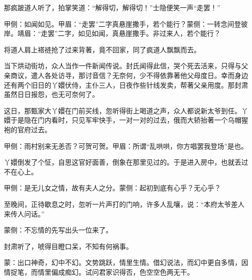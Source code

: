 \begin{parag}
    那疯跛道人听了，拍掌笑道：“解得切，解得切！”士隐便笑一声“走罢！”\begin{note}甲侧：如闻如见。甲眉：“走罢”二字真悬崖撒手，若个能行？蒙侧：一转念间登彼岸。靖眉：“走罢”二字，如见如闻，真悬崖撒手。非过来人，若个能行？\end{note}将道人肩上褡裢抢了过来背著，竟不回家，同了疯道人飘飘而去。
\end{parag}


\begin{parag}
    当下烘动街坊，众人当作一件新闻传说。封氏闻得此信，哭个死去活来，只得与父亲商议，遣人各处访寻，那讨音信？无奈何，少不得依靠著他父母度日。幸而身边还有两个旧日的丫嬛伏侍，主仆三人，日夜作些针线发卖，帮著父亲用度。那封肃虽然日日报怨，也无可奈何了。
\end{parag}


\begin{parag}
    这日，那甄家大丫嬛在门前买线，忽听得街上喝道之声，众人都说新太爷到任。丫嬛于是隐在门内看时，只见军牢快手，一对一对的过去，俄而大轿抬著一个乌帽猩袍的官府过去。\begin{note}甲侧：雨村别来无恙否？可贺可贺。甲眉：所谓“乱哄哄，你方唱罢我登场”是也。\end{note}丫嬛倒发了个怔，自思这官好面善，倒象在那里见过的。于是进入房中，也就丢过不在心上。\begin{note}甲侧：是无儿女之情，故有夫人之分。蒙侧：起初到底有心乎？无心乎？\end{note}至晚间，正待歇息之时，忽听一片声打的门响，许多人乱嚷，说：“本府太爷差人来传人问话。”\begin{note}蒙侧：不忘情的先写出头一位来了。\end{note}封肃听了，唬得目瞪口呆，不知有何祸事。
\end{parag}


\begin{parag}
    \begin{note}蒙：出口神奇，幻中不幻。文势跳跃，情里生情。借幻说法，而幻中更自多情，因情捉笔，而情里偏成痴幻。试问君家识得否，色空空色两无干。\end{note}
\end{parag}

